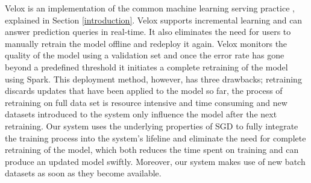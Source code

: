 \documentclass{vldb}
\begin{document}
Velox is an implementation of the common machine learning serving practice \cite{crankshaw2014missing}, explained in Section \ref{introduction}.
Velox supports incremental learning and can answer prediction queries in real-time.
It also eliminates the need for users to manually retrain the model offline and redeploy it again.
Velox monitors the quality of the model using a validation set and once the error rate has gone beyond a predefined threshold it initiates a complete retraining of the model using Spark. 
This deployment method, however, has three drawbacks; retraining discards updates that have been applied to the model so far, the process of retraining on full data set is resource intensive and time consuming and new datasets introduced to the system only influence the model after the next retraining.
Our system uses the underlying properties of SGD to fully integrate the training process into the system's lifeline and eliminate the need for complete retraining of the model, which both reduces the time spent on training and can produce an updated model swiftly.
Moreover, our system makes use of new batch datasets as soon as they become available.  
\end{document}
